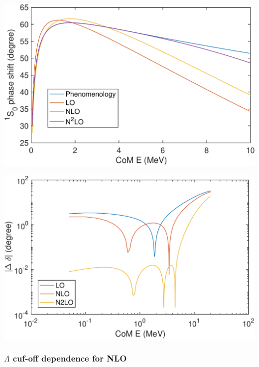 \documentclass{article}
\newenvironment{Figure}
  {\par\medskip\noindent\minipage{\linewidth}}
  {\endminipage\par\medskip}
\begin{document}
\begin{multicols}{2}
\begin{Figure}
\centering
\includegraphics[width=\textwidth]{ps1.pdf}
\end{Figure}

\begin{Figure}
\centering
\includegraphics[width=\textwidth]{ps_diff1.pdf}
\end{Figure}

\subsubsection{$\Lambda$ cuf-off dependence for NLO}


\end{multicols}
\end{document}
